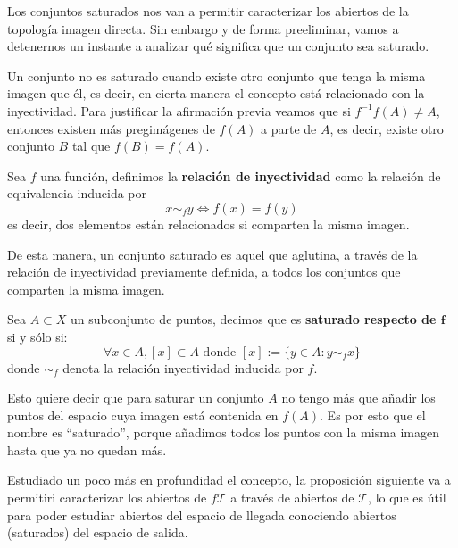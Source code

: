 Los conjuntos saturados nos van a permitir caracterizar los abiertos de la topología imagen directa. Sin embargo y de forma preeliminar, vamos a detenernos un instante a analizar qué significa que un conjunto sea saturado.

Un conjunto no es saturado cuando existe otro conjunto que tenga la misma imagen que él, es decir, en cierta manera el concepto está relacionado con la inyectividad. Para justificar la afirmación previa veamos que si $f^{-1}f (A) \neq A$, entonces existen más pregimágenes de $f(A)$ a parte de $A$, es decir, existe otro conjunto $B$ tal que $f(B) = f(A)$.

\begin{defi}
Sea $f$ una función, definimos la \textbf{relación de inyectividad} como la relación de equivalencia inducida por
\[
x \sim_f y \Leftrightarrow f\left( x \right) = f\left( y \right)
\]
es decir, dos elementos están relacionados si comparten la misma imagen.
\end{defi}

De esta manera, un conjunto saturado es aquel que aglutina, a través de la relación de inyectividad previamente definida, a todos los conjuntos que comparten la misma imagen.

\begin{defi}
Sea $A \subset X$ un subconjunto de puntos, decimos que es \textbf{saturado respecto de $\boldsymbol{f}$} si y sólo si:
\[
\forall x \in A, [x]\subset A \mbox{ donde } [x] := \{y \in A: y \sim_f x\}
\]
donde $\sim_f$ denota la relación inyectividad inducida por $f$.
\end{defi}

\begin{obs}
Esto quiere decir que para saturar un conjunto $A$ no tengo más que añadir los puntos del espacio cuya imagen está contenida en $f(A)$. Es por esto que el nombre es ``saturado'', porque añadimos todos los puntos con la misma imagen hasta que ya no quedan más.
\end{obs}

Estudiado un poco más en profundidad el concepto, la proposición siguiente va a permitiri caracterizar los abiertos de $f\mathcal{T}$ a través de abiertos de $\mathcal{T}$, lo que es útil para poder estudiar abiertos del espacio de llegada conociendo abiertos (saturados) del espacio de salida.

